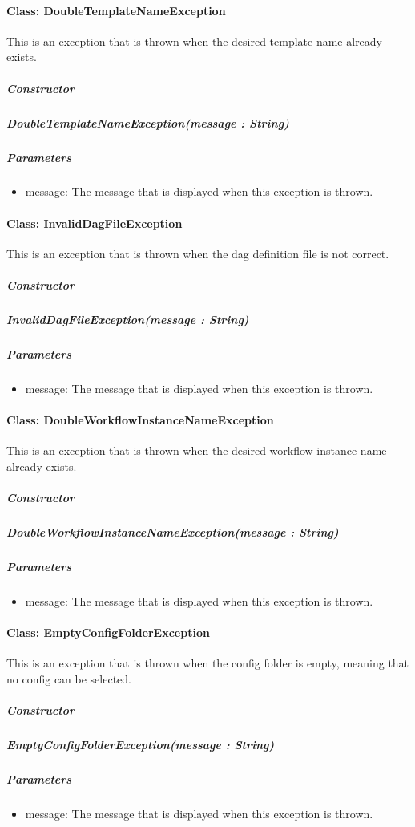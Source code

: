 \paragraph{Class: DoubleTemplateNameException}
This is an exception that is thrown when the desired template name already exists.
\subparagraph{Constructor}

\subparagraph{DoubleTemplateNameException(message : String)}
\subparagraph{Parameters}
\begin{itemize}
    \item{message:}
    The message that is displayed when this exception is thrown.
\end{itemize}


\paragraph{Class: InvalidDagFileException}
This is an exception that is thrown when the dag definition file is not correct.
\subparagraph{Constructor}

\subparagraph{InvalidDagFileException(message : String)}
\subparagraph{Parameters}
\begin{itemize}
    \item{message:}
    The message that is displayed when this exception is thrown.
\end{itemize}


\paragraph{Class: DoubleWorkflowInstanceNameException}
This is an exception that is thrown when the desired workflow instance name already exists.
\subparagraph{Constructor}

\subparagraph{DoubleWorkflowInstanceNameException(message : String)}
\subparagraph{Parameters}
\begin{itemize}
    \item{message:}
    The message that is displayed when this exception is thrown.
\end{itemize}


\paragraph{Class: EmptyConfigFolderException}
This is an exception that is thrown when the config folder is empty, meaning that no config can be selected.
\subparagraph{Constructor}

\subparagraph{EmptyConfigFolderException(message : String)}
\subparagraph{Parameters}
\begin{itemize}
    \item{message:}
    The message that is displayed when this exception is thrown.
\end{itemize}


